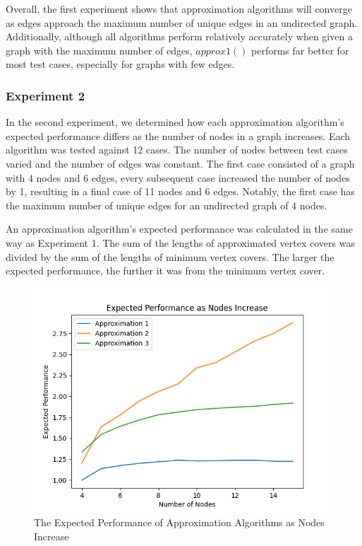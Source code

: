 \documentclass[titlepage]{article}
\begin{document}
Overall, the first experiment shows that approximation algorithms will converge as edges approach the maximum number of unique edges in an undirected graph. Additionally, although all algorithms perform relatively accurately when given a graph with the maximum number of edges, $approx1()$ performs far better for most test cases, especially for graphs with few edges.

\subsubsection{Experiment 2}

In the second experiment, we determined how each approximation algorithm's expected performance differs as the number of nodes in a graph increases. Each algorithm was tested against 12 cases. The number of nodes between test cases varied and the number of edges was constant. The first case consisted of a graph with 4 nodes and 6 edges, every subsequent case increased the number of nodes by 1, resulting in a final case of 11 nodes and 6 edges. Notably, the first case has the maximum number of unique edges for an undirected graph of 4 nodes.

An approximation algorithm's expected performance was calculated in the same way as Experiment 1. The sum of the lengths of approximated vertex covers was divided by the sum of the lengths of minimum vertex covers. The larger the expected performance, the further it was from the minimum vertex cover.

\begin{figure}[H]
    \centering
    \includegraphics[width=0.8\linewidth]{experiment_3_2.png}
    \caption{The Expected Performance of Approximation Algorithms as Nodes Increase}
    \label{fig:experiment_3_2}
\end{figure}
\end{document}
